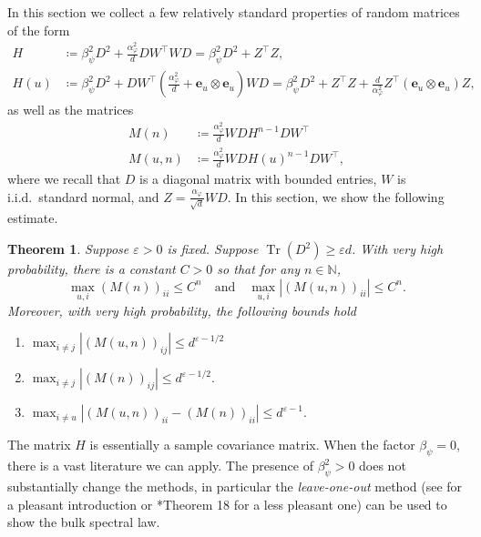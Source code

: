 \documentclass[letterpaper, 10pt, dvipsnames]{article}
\numberwithin{equation}{section}
\DeclareMathOperator{\Tr}{Tr}
\newcommand{\tr}{\Tr}
\newcommand{\N}{\mathbb{N}}
\renewcommand{\epsilon}{\varepsilon}
\renewcommand{\phi}{\varphi}
\newtheorem{thm}[ccounter]{Theorem}
\theoremstyle{definition}
\begin{document}
In this section we collect a few relatively standard properties of random matrices of the form 
\begin{equation}\label{a:samplecov}
  \begin{aligned}
  H & \coloneqq \beta_\psi^2 D^2 + \frac{\alpha_\phi^2}{d} D W^{\top} W D = \beta_\psi^2 D^2 + Z^{\top} Z, \\
  H(u) & \coloneqq \beta_\psi^2 D^2 +  D W^{\top}\left(\frac{\alpha_\phi^2}{d} + \mathbf{e}_u \otimes \mathbf{e}_u \right) W D = \beta_\psi^2D^2 +  Z^{\top} Z + \frac{d}{\alpha_\phi^2} Z^\top(\mathbf{e}_u \otimes \mathbf{e}_u)Z,
  \end{aligned}
\end{equation}
as well as the matrices 
\begin{equation}\label{a:samplecov2}
  \begin{aligned}
  M(n) & \coloneqq \frac{\alpha_\phi^2}{d}WD H^{n-1} D W^{\top} \\
  M(u,n) & \coloneqq \frac{\alpha_\phi^2}{d} WD H(u)^{n-1} D W^{\top},
  \end{aligned}
\end{equation}
where we recall that $D$ is a diagonal matrix with bounded entries, $W$ is i.i.d.\ standard normal, and $Z=\frac{\alpha_\phi}{\sqrt{d}}WD$. In this section, we show the following estimate.
\begin{thm}\label{a:main}
  Suppose $\epsilon > 0$ is fixed.
  Suppose $\tr(D^2) \geq \epsilon d$.
  With very high probability, there is a constant $C  > 0$ so that for any $n \in \N$,
  \[
  \max_{u,i} (M(n))_{ii} \leq C^n 
  \quad \text{and} \quad
  \max_{u,i} |(M(u,n))_{ii}| \leq C^n.
  \]
  Moreover, with very high probability, the following bounds hold
  \begin{enumerate}
    \item 
    \(
    \max_{i \neq j} |(M(u,n))_{ij}| \leq d^{\epsilon-1/2}
    \)
    \item 
    \(
    \max_{i \neq j} |(M(n))_{ij}| \leq d^{\epsilon-1/2}.
    \)
    \item 
    \(
    \max_{i \neq u} |(M(u,n))_{ii} - (M(n))_{ii}| \leq d^{\epsilon-1}.
    \)
  \end{enumerate}
\end{thm}


The matrix $H$ is essentially a sample covariance matrix.  When the factor $\beta_\psi = 0$, there is a vast literature we can apply.  The presence of $\beta_\psi^2 > 0$ does not substantially change the methods, in particular the \emph{leave-one-out} method (see \cite{LiaoCouillet} for a pleasant introduction or \cite{ElliotPaquetteNotes}*{Theorem 18} for a less pleasant one) can be used to show the bulk spectral law.
\end{document}
